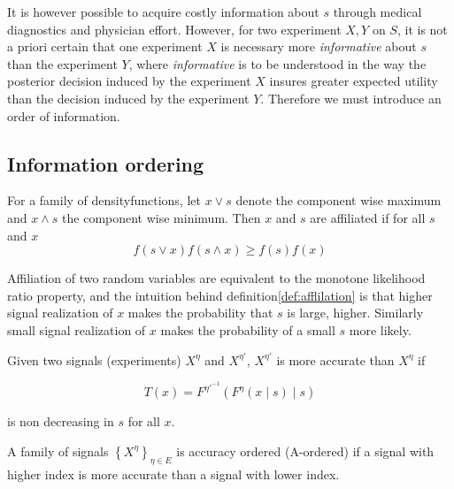 \documentclass[10pt,a4paper]{article} 					%
\begin{document}
It is however possible to acquire costly information about $s$ through medical diagnostics and physician effort. However, for two experiment $X,Y$ on $S$, it is not a priori certain that one experiment $X$ is necessary more \emph{informative} about $s$ than the experiment $Y$, where \emph{informative} is to be understood in the way the posterior decision induced by the experiment $X$ insures greater expected utility than the decision induced by the experiment $Y$. Therefore we must introduce an order of information.


\subsection{Information ordering}

\begin{defn}\label{def:afflilation} \parencite{Milgrom1982}
For a family of densityfunctions, let $x\lor s$ denote the component wise maximum and $x\land s$ the component wise minimum. Then $x$ and $s$ are affiliated if for all $s$ and $x$
\[
	f(s\lor x)f(s\land x)\ge f(s)f(x)
\]
\end{defn}

Affiliation of two random variables are equivalent to the monotone likelihood ratio property, and the intuition behind definition\cref{def:afflilation} is that higher signal realization of $x$ makes the probability that $s$ is large, higher. Similarly small signal realization of $x$ makes the probability of a small $s$ more likely.

\begin{defn}\label{def:accuracy}
\parencite{Persico2000} Given two signals (experiments) $X^{\eta}$ and $X^{\eta'}$, $X^{\eta'}$ is more accurate than $X^{\eta}$ if

\[
	T(x)=F^{\eta'^{-1}}(F^{\eta}(x\mid s)\mid s)\label{eq:acuracy tranformation}
\]

is non decreasing in $s$ for all $x$.

A family of signals $\left \{ X^{\eta}\right \} _{\eta\in E}$ is accuracy ordered (A-ordered) if a signal with higher index is more accurate than a signal with lower index.
\end{defn}
\end{document}

